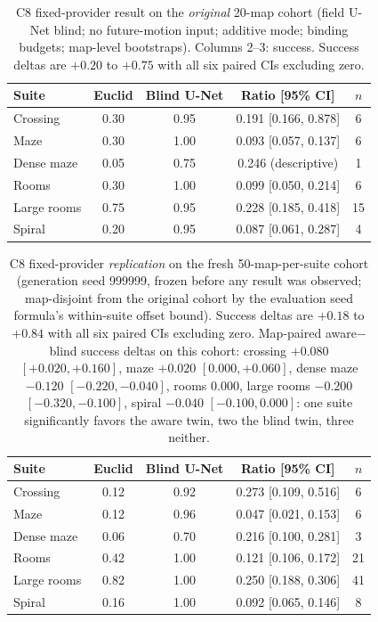 \documentclass[letterpaper]{article} %
\newcommand{\stage}[1]{\textsc{#1}}
\begin{document}
\begin{table}[t]
\centering
\small
\setlength{\tabcolsep}{3pt}
\begin{tabular}{@{}lcccc@{}}
\toprule
Suite & Euclid & Blind U-Net & Ratio [95\% CI] & $n$ \\
\midrule
Crossing & 0.30 & 0.95 & 0.191 [0.166, 0.878] & 6 \\
Maze & 0.30 & 1.00 & 0.093 [0.057, 0.137] & 6 \\
Dense maze & 0.05 & 0.75 & 0.246 (descriptive) & 1 \\
Rooms & 0.30 & 1.00 & 0.099 [0.050, 0.214] & 6 \\
Large rooms & 0.75 & 0.95 & 0.228 [0.185, 0.418] & 15 \\
Spiral & 0.20 & 0.95 & 0.087 [0.061, 0.287] & 4 \\
\bottomrule
\end{tabular}
\caption{\stage{C8} fixed-provider result on the \emph{original} 20-map cohort (field U-Net blind; no future-motion input; additive mode; binding budgets; map-level bootstraps). Columns 2--3: success. Success deltas are $+0.20$ to $+0.75$ with all six paired CIs excluding zero.}
\label{tab:c8fixed}
\end{table}

\begin{table}[t]
\centering
\small
\setlength{\tabcolsep}{3pt}
\begin{tabular}{@{}lcccc@{}}
\toprule
Suite & Euclid & Blind U-Net & Ratio [95\% CI] & $n$ \\
\midrule
Crossing & 0.12 & 0.92 & 0.273 [0.109, 0.516] & 6 \\
Maze & 0.12 & 0.96 & 0.047 [0.021, 0.153] & 6 \\
Dense maze & 0.06 & 0.70 & 0.216 [0.100, 0.281] & 3 \\
Rooms & 0.42 & 1.00 & 0.121 [0.106, 0.172] & 21 \\
Large rooms & 0.82 & 1.00 & 0.250 [0.188, 0.306] & 41 \\
Spiral & 0.16 & 1.00 & 0.092 [0.065, 0.146] & 8 \\
\bottomrule
\end{tabular}
\caption{\stage{C8} fixed-provider \emph{replication} on the fresh 50-map-per-suite cohort (generation seed 999999, frozen before any result was observed; map-disjoint from the original cohort by the evaluation seed formula's within-suite offset bound). Success deltas are $+0.18$ to $+0.84$ with all six paired CIs excluding zero. Map-paired aware$-$blind success deltas on this cohort: crossing $+0.080$ $[+0.020,+0.160]$, maze $+0.020$ $[0.000,+0.060]$, dense maze $-0.120$ $[-0.220,-0.040]$, rooms $0.000$, large rooms $-0.200$ $[-0.320,-0.100]$, spiral $-0.040$ $[-0.100,0.000]$: one suite significantly favors the aware twin, two the blind twin, three neither.}
\label{tab:c8fresh}
\end{table}
\end{document}

